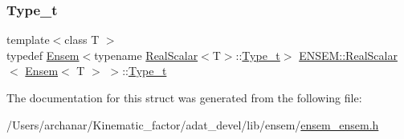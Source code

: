 \mbox{\label{structENSEM_1_1RealScalar_3_01Ensem_3_01T_01_4_01_4_a7822ecdfc2f8d6c24460263831283db8}} 
\subsubsection{\texorpdfstring{Type\_t}{Type\_t}\hspace{0.1cm}{\footnotesize\ttfamily [2/2]}}
{\footnotesize\ttfamily template$<$class T $>$ \\
typedef \mbox{\hyperlink{classENSEM_1_1Ensem}{Ensem}}$<$typename \mbox{\hyperlink{structENSEM_1_1RealScalar}{Real\+Scalar}}$<$T$>$\+::\mbox{\hyperlink{structENSEM_1_1RealScalar_3_01Ensem_3_01T_01_4_01_4_a7822ecdfc2f8d6c24460263831283db8}{Type\+\_\+t}}$>$ \mbox{\hyperlink{structENSEM_1_1RealScalar}{E\+N\+S\+E\+M\+::\+Real\+Scalar}}$<$ \mbox{\hyperlink{classENSEM_1_1Ensem}{Ensem}}$<$ T $>$ $>$\+::\mbox{\hyperlink{structENSEM_1_1RealScalar_3_01Ensem_3_01T_01_4_01_4_a7822ecdfc2f8d6c24460263831283db8}{Type\+\_\+t}}}



The documentation for this struct was generated from the following file\+:\begin{DoxyCompactItemize}
\item 
/\+Users/archanar/\+Kinematic\+\_\+factor/adat\+\_\+devel/lib/ensem/\mbox{\hyperlink{lib_2ensem_2ensem__ensem_8h}{ensem\+\_\+ensem.\+h}}\end{DoxyCompactItemize}
